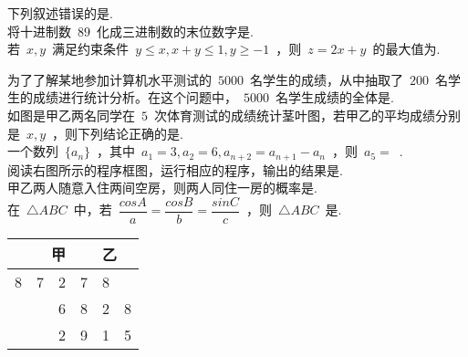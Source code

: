 \documentclass{BHCexam}
\begin{document}
\maketitle

\begin{questions}

\xuanze
\question 下列叙述错误的是.\\
\qs 将十进制数~$89$~化成三进制数的末位数字是.\\
\question 若~$x,y$~满足约束条件~$y\leq x,x+y\leq 1,y\geq -1$~，则~$z=2x+y$~的最大值为.\\
\begin{minipage}[b]{0.8\linewidth}
\question 为了了解某地参加计算机水平测试的~$5000$~名学生的成绩，从中抽取了~$200$~名学生的成绩进行统计分析。在这个问题中，~$5000$~名学生成绩的全体是.\\
\question 如图是甲乙两名同学在~$5$~次体育测试的成绩统计茎叶图，若甲乙的平均成绩分别是~$x,y$~，则下列结论正确的是.\\
\question 一个数列~$\{a_n \}$~，其中~$a_1=3,a_2=6,a_{n+2}=a_{n+1}-a_n$~，则~$a_5=$~.\\
\question  阅读右图所示的程序框图，运行相应的程序，输出的结果是.\\
\qs 甲乙两人随意入住两间空房，则两人同住一房的概率是.\\
\qs 在~$\triangle ABC$~中，若~$\dfrac{cosA}{a}=\dfrac{cosB}{b}=\dfrac{sinC}{c}$~，则~$\triangle ABC$~是.\\
\end{minipage}
\begin{minipage}[b]{0.2\linewidth}
\begin{flushright}
\begin{tabular}{r|c|l}
甲&&乙\\
\hline
8~~7~~2&7&8\\
6&8&2~~8\\
2&9&1~~5
\end{tabular}



\end{flushright}
\end{minipage}
\end{questions}
\end{document}
